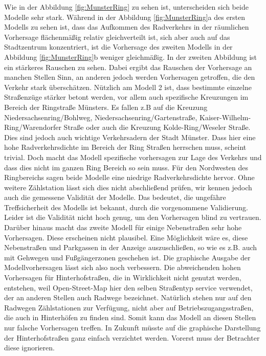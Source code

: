 \documentclass[a4paper,12pt]{thesis}
\begin{document}
Wie in der Abbildung \ref{fig:MunsterRing} zu sehen ist, unterscheiden sich beide Modelle sehr stark. Während in der Abbildung \ref{fig:MunsterRing}a des ersten Modells zu sehen ist, dass das Aufkommen des Radverkehrs in der räumlichen Vorhersage flächenmäßig relativ gleichverteilt ist, sich aber auch auf das Stadtzentrum konzentriert, ist die Vorhersage des zweiten Modells in der Abbildung \ref{fig:MunsterRing}b weniger gleichmäßig. In der zweiten Abbildung ist ein stärkeres Rauschen zu sehen. Dabei ergibt das Rauschen der Vorhersage an manchen Stellen Sinn, an anderen jedoch werden Vorhersagen getroffen, die den Verkehr stark überschätzen. Nützlich am Modell 2 ist, dass bestimmte einzelne Straßenzüge stärker betont werden, vor allem auch spezifische Kreuzungen im Bereich der Ringstraße Münsters. Es fallen z.B auf die Kreuzung Niedersachsenring/Bohlweg, Niedersachsenring/Gartenstraße, Kaiser-Wilhelm-Ring/Warendorfer Straße oder auch die Kreuzung Kolde-Ring/Weseler Straße. Dies sind jedoch auch wichtige Verkehrsadern der Stadt Münster. Dass hier eine hohe Radverkehrsdichte im Bereich der Ring Straßen herrschen muss, scheint trivial. Doch macht das Modell spezifische vorhersagen zur Lage des Verkehrs und dass dies nicht im ganzen Ring Bereich so sein muss. Für den Nordwesten des Ringbereichs sagen beide Modelle eine niedrige Radverkehrsdichte hervor. Ohne weitere Zählstation lässt sich dies nicht abschließend prüfen, wir kennen jedoch auch die gemessene Validität der Modelle. Das bedeutet, die ungefähre Treffsicherheit des Modells ist bekannt, durch die vorgenommene Validierung. Leider ist die Validität nicht hoch genug, um den Vorhersagen blind zu vertrauen. Darüber hinaus macht das zweite Modell für einige Nebenstraßen sehr hohe Vorhersagen. Diese erscheinen nicht plausibel. Eine Möglichkeit wäre es, diese Nebenstraßen und Parkgassen in der Anzeige auszuschließen, so wie es z.B. auch mit Gehwegen und Fußgängerzonen geschehen ist. Die graphische Ausgabe der Modellvorhersagen lässt sich also noch verbessern. Die abweichenden hohen Vorhersagen für Hinterhofstraßen, die in Wirklichkeit nicht genutzt werden, entstehen, weil Open-Street-Map hier den selben Straßentyp \glqq{}service\grqq{} verwendet, der an anderen Stellen auch Radwege bezeichnet. Natürlich stehen nur auf den Radwegen Zählstationen zur Verfügung, nicht aber auf Betriebszugangsstraßen, die auch in Hinterhöfen zu finden sind. Somit kann das Modell an diesen Stellen nur falsche Vorhersagen treffen. In Zukunft müsste auf die graphische Darstellung der Hinterhofstraßen ganz einfach verzichtet werden. Vorerst muss der Betrachter diese ignorieren.\\
\end{document}
